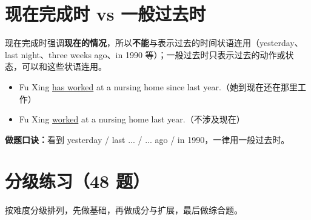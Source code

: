\documentclass[11pt,a4paper]{ctexart}
\begin{document}
\section{现在完成时 vs 一般过去时}
现在完成时强调\textbf{现在的情况}，所以\textbf{不能}与表示过去的时间状语连用（yesterday、last night、three weeks ago、in 1990 等）；一般过去时只表示过去的动作或状态，可以和这些状语连用。
\begin{itemize}[leftmargin=1.4em]
\item Fu Xing \underline{has worked} at a nursing home since last year.（她到现在还在那里工作）
\item Fu Xing \underline{worked} at a nursing home last year.（不涉及现在）
\end{itemize}
\textbf{做题口诀：}看到 yesterday / last ... / ... ago / in 1990，一律用一般过去时。


\newpage
\section{分级练习（48 题）}
\noindent 按难度分级排列，先做基础，再做成分与扩展，最后做综合题。
\end{document}
